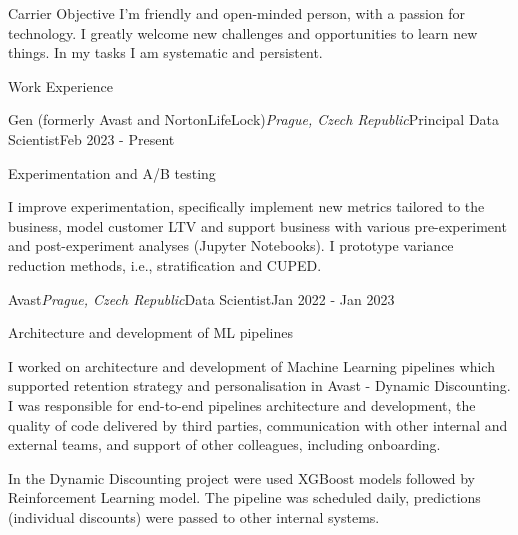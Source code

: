 \documentclass{resume} %
\begin{document}
\begin{rSection}{Carrier Objective}
I’m friendly and open-minded person, with a passion for technology. I greatly welcome new challenges and opportunities to learn new things. In my tasks I am systematic and persistent.
\end{rSection}

\begin{rSection}{Work Experience}
 
    \begin{rSubsection}{Gen (formerly Avast and NortonLifeLock)}{\em Prague, Czech Republic}{Principal Data Scientist}{Feb 2023 - Present}
        \item Experimentation and A/B testing
        
        I improve experimentation, specifically implement new metrics tailored to the business, model customer LTV and support business with various pre-experiment and post-experiment analyses (Jupyter Notebooks). I prototype variance reduction methods, i.e., stratification and CUPED.

    \end{rSubsection}

    \begin{rSubsection}{Avast}{\em Prague, Czech Republic}{Data Scientist}{Jan 2022 - Jan 2023}
        \item Architecture and development of ML pipelines
        
        I worked on architecture and development of Machine Learning pipelines which supported retention strategy and personalisation in Avast - Dynamic Discounting. I was responsible for end-to-end pipelines architecture and development, the quality of code delivered by third parties, communication with other internal and external teams, and support of other colleagues, including onboarding.
        
        In the Dynamic Discounting project were used XGBoost models followed by Reinforcement Learning model. The pipeline was scheduled daily, predictions (individual discounts) were passed to other internal systems.


\end{rSubsection}
\end{rSection}
\end{document}
